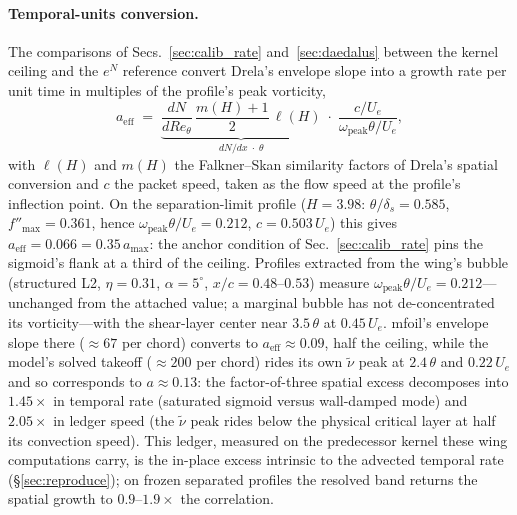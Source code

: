 \documentclass[journal]{new-aiaa}
\begin{document}
\paragraph{Temporal-units conversion.} The comparisons of
Secs.~\ref{sec:calib_rate} and~\ref{sec:daedalus} between the kernel
ceiling and the $e^N$ reference convert Drela's envelope slope into a
growth rate per unit time in multiples of the profile's peak vorticity,
\begin{equation*}
  a_\mathrm{eff}
  \;=\;
  \underbrace{\frac{dN}{dRe_\theta}\,\frac{m(H)+1}{2}\,\ell(H)}_{dN/dx\;\cdot\;\theta}
  \;\cdot\;\frac{c/U_e}{\omega_\mathrm{peak}\theta/U_e},
\end{equation*}
with $\ell(H)$ and $m(H)$ the Falkner--Skan similarity factors of
Drela's spatial conversion and $c$ the packet speed, taken as the flow
speed at the profile's inflection point. On the separation-limit
profile ($H\!=\!3.98$: $\theta/\delta_s\!=\!0.585$,
$f''_{\max}\!=\!0.361$, hence
$\omega_\mathrm{peak}\theta/U_e\!=\!0.212$, $c\!=\!0.503\,U_e$) this
gives $a_\mathrm{eff}\!=\!0.066\!=\!0.35\,a_{\max}$: the anchor
condition of Sec.~\ref{sec:calib_rate} pins the sigmoid's flank at a
third of the ceiling. Profiles extracted from the wing's bubble
(structured L2, $\eta\!=\!0.31$, $\alpha\!=\!5^\circ$,
$x/c\!=\!0.48$--$0.53$) measure
$\omega_\mathrm{peak}\theta/U_e\!=\!0.212$---unchanged from the
attached value; a marginal bubble has not de-concentrated its
vorticity---with the shear-layer center near $3.5\,\theta$ at
$0.45\,U_e$. mfoil's envelope slope there ($\approx\!67$ per chord)
converts to $a_\mathrm{eff}\!\approx\!0.09$, half the ceiling, while
the model's solved takeoff ($\approx\!200$ per chord) rides its own
$\tilde\nu$ peak at $2.4\,\theta$ and $0.22\,U_e$ and so corresponds to
$a\!\approx\!0.13$: the factor-of-three spatial excess decomposes into
$1.45\times$ in temporal rate (saturated sigmoid versus wall-damped
mode) and $2.05\times$ in ledger speed (the $\tilde\nu$ peak rides
below the physical critical layer at half its convection speed). This
ledger, measured on the predecessor kernel these wing computations carry,
is the in-place excess intrinsic to the advected temporal rate
(\S\ref{sec:reproduce}); on frozen separated profiles the resolved band
returns the spatial growth to $0.9$--$1.9\times$ the correlation.
\end{document}
